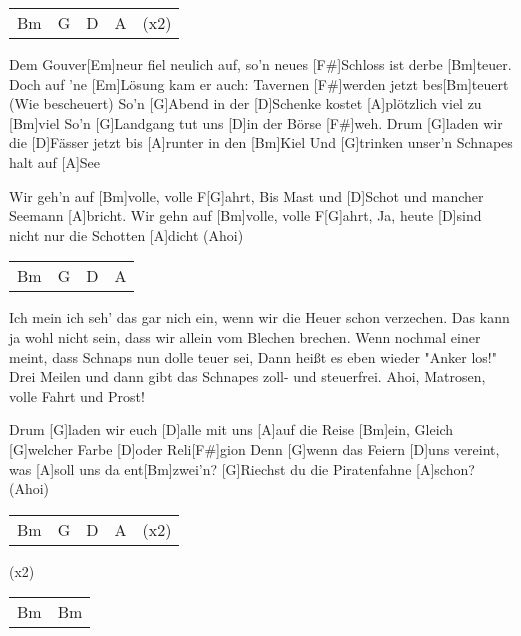 

\begin{guitar}
	 {\footnotesize\begin{tabular}{l|l|l|l l}
			Bm & G & D & A & (x2)
	\end{tabular}}
	
	Dem Gouver[Em]neur fiel neulich auf, so'n neues [F#]Schloss ist derbe [Bm]teuer.
	Doch auf 'ne [Em]Lösung kam er auch: Tavernen [F#]werden jetzt bes[Bm]teuert (Wie bescheuert)
	So'n [G]Abend in der [D]Schenke kostet [A]plötzlich viel zu [Bm]viel
	So'n [G]Landgang tut uns [D]in der Börse [F#]weh.
	Drum [G]laden wir die [D]Fässer jetzt bis [A]runter in den [Bm]Kiel
	Und [G]trinken unser'n Schnapes halt auf [A]See
	
	Wir geh'n auf [Bm]volle, volle F[G]ahrt, 
	Bis Mast und [D]Schot und mancher Seemann [A]bricht.
	Wir gehn auf [Bm]volle, volle F[G]ahrt,
	Ja, heute [D]sind nicht nur die Schotten [A]dicht (Ahoi)
	
	 {\footnotesize\begin{tabular}{l|l|l|l}
			Bm & G & D & A 
	\end{tabular}}
	
	Ich mein ich seh' das gar nich ein, wenn wir die Heuer schon verzechen.
	Das kann ja wohl nicht sein, dass wir allein vom Blechen brechen.
	Wenn nochmal einer meint, dass Schnaps nun dolle teuer sei,
	Dann heißt es eben wieder "Anker los!"
	Drei Meilen und dann gibt das Schnapes zoll- und steuerfrei.
	Ahoi, Matrosen, volle Fahrt und Prost!
	
	 
	
	Drum [G]laden wir euch [D]alle mit uns [A]auf die Reise [Bm]ein, 
	Gleich [G]welcher Farbe [D]oder Reli[F#]gion
	Denn [G]wenn das Feiern [D]uns vereint, was [A]soll uns da ent[Bm]zwei'n?
	[G]Riechst du die Piratenfahne [A]schon? (Ahoi)
	
	{\footnotesize\begin{tabular}{l|l|l|l l}
			Bm & G & D & A & (x2)
	\end{tabular}}

	  (x2)
	
	{\footnotesize\begin{tabular}{l|l}
			Bm & Bm
	\end{tabular}}
\end{guitar}